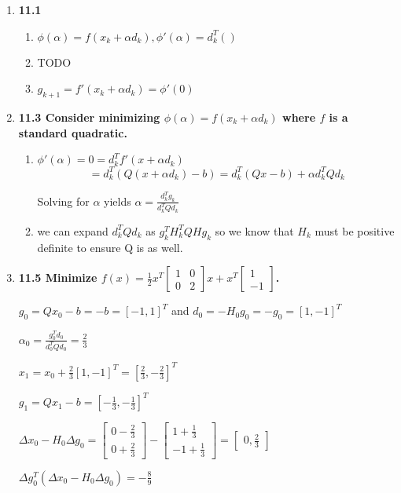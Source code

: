 \documentclass[10pt,a4paper]{article}
\newcommand\m[1]{\begin{bmatrix}#1\end{bmatrix}}
\begin{document}
\begin{enumerate}
    \item \textbf{11.1 }
    \begin{enumerate}
        \item $\phi(\alpha) = f(x_k + \alpha d_k), \phi'(\alpha) = d_k^T()$
        \item TODO
        \item $g_{k+1} = f'(x_k + \alpha d_k) = \phi'(0) $
    \end{enumerate}
    
    \item \textbf{11.3 Consider minimizing $\phi(\alpha) = f(x_k + \alpha d_k)$ where $f$ is a standard quadratic.}
    \begin{enumerate}
        \item $\phi'(\alpha) = 0 = d_k^Tf'(x+ \alpha d_k)$
        $$ = d_k^T(Q(x+\alpha d_k) - b) = d_k^T(Qx - b) + \alpha d_k^TQd_k$$

        Solving for $\alpha$ yields $\alpha  = \frac{d_k^Tg_k}{d_k^TQd_k}$

        \item we can expand $d_k^TQd_k$ as $g_k^TH_k^TQHg_k$ so we know that $H_k$ must be positive definite to ensure Q is as well.
    \end{enumerate}

    \item \textbf{11.5 Minimize $f(x) = \frac{1}{2} x^T \m{1 & 0 \\0 & 2} x + x^T\m{1 \\ -1}$.}
    
    $g_0 = Qx_0 -b = -b = [-1, 1]^T$ and $d_0 = -H_0g_0 = -g_0 = [1, -1]^T$

    $\alpha_0 = \frac{g_0^Td_0}{d_0^TQd_0} = \frac{2}{3}$

    $x_1 = x_0 + \frac{2}{3}[1, -1]^T = [\frac{2}{3}, -\frac{2}{3}]^T$

    $g_1 = Qx_1 -b = [-\frac{1}{3}, -\frac{1}{3}]^T$

    $\Delta x_0 - H_0 \Delta g_0 = \begin{bmatrix}  0-\frac{2}{3} \\ 0 +\frac{2}{3}\end{bmatrix} - \begin{bmatrix} 1 + \frac{1}{3} \\ -1 + \frac{1}{3} \end{bmatrix} = \begin{bmatrix}0, \frac{2}{3}\end{bmatrix}$

    $\Delta g_0^T(\Delta x_0 - H_0 \Delta g_0) =  - \frac{8}{9}$
    

\end{enumerate}
\end{document}
